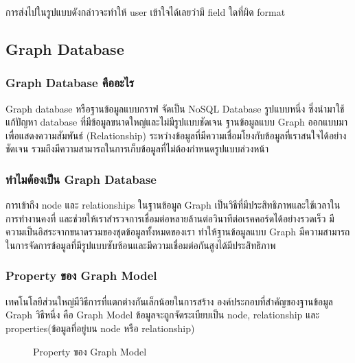 \documentclass[14pt,oneside,openright,a4paper]{cpe-thai-project}
\begin{document}
การส่งไปในรูปแบบดังกล่าวจะทำให้ user เข้าใจได้เลยว่ามี field ใดที่ผิด format



\subsection {Graph Database} 
  \subsubsection {Graph Database คืออะไร}
    Graph database \cite{GraphDatabase} หรือฐานข้อมูลแบบกราฟ จัดเป็น NoSQL Database รูปแบบหนึ่ง ซึ่งนำมาใช้แก้ปัญหา database ที่มีข้อมูลขนาดใหญ่และไม่มีรูปแบบชัดเจน
    ฐานข้อมูลแบบ Graph ออกแบบมาเพื่อแสดงความสัมพันธ์ (Relationship) ระหว่างข้อมูลที่มีความเชื่อมโยงกับข้อมูลที่เราสนใจได้อย่างชัดเจน รวมถึงมีความสามารถในการเก็บข้อมูลที่ไม่ต้องกำหนดรูปแบบล่วงหน้า
  \subsubsection {ทำไมต้องเป็น Graph Database}
    การเข้าถึง node และ relationships ในฐานข้อมูล Graph เป็นวิธีที่มีประสิทธิภาพและใช้เวลาในการทำงานคงที่ และช่วยให้เราสำรวจการเชื่อมต่อหลายล้านต่อวินาทีต่อเรคคอร์ดได้อย่างรวดเร็ว
    มีความเป็นอิสระจากขนาดรวมของชุดข้อมูลทั้งหมดของเรา ทำให้ฐานข้อมูลแบบ Graph มีความสามารถในการจัดการข้อมูลที่มีรูปแบบซับซ้อนและมีความเชื่อมต่อกันสูงได้มีประสิทธิภาพ 

  \subsubsection {Property ของ Graph Model \cite{GraphDatabaseProperty}} 
    เทคโนโลยีส่วนใหญ่มีวิธีการที่แตกต่างกันเล็กน้อยในการสร้าง องค์ประกอบที่สำคัญของฐานข้อมูล Graph วิธีหนึ่ง คือ Graph Model ข้อมูลจะถูกจัดระเบียบเป็น node, relationship และ properties(ข้อมูลที่อยู่บน node หรือ relationship)

    \begin{figure}[!h]\centering
      \setlength{\fboxrule}{0.5mm} %
      \setlength{\fboxsep}{0.5cm}
      \caption{Property ของ Graph Model}\label{fig:Graph}
      \end{figure}
\end{document}
